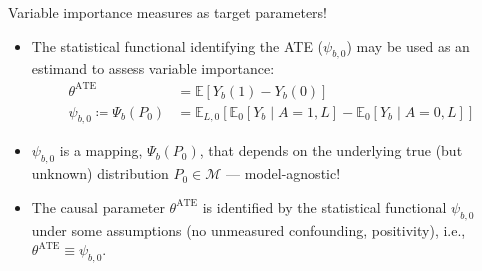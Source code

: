\documentclass{beamer}
\begin{document}
\begin{frame}[c]{Variable importance measures as target parameters!}

\begin{center}
\begin{itemize}
  \itemsep6pt
  \item The statistical functional identifying the ATE ($\psi_{b,0}$) may be
    used as an estimand to assess variable importance:
    \begin{align*}
      \theta^{\text{ATE}} &= \mathbb{E}[Y_b(1) - Y_b(0)] \\
      \psi_{b,0} \coloneqq \Psi_b(P_0) &= \mathbb{E}_{L,0}[\mathbb{E}_0[Y_b
        \mid A = 1, L] - \mathbb{E}_0[Y_b \mid A = 0, L]]
    \end{align*}
  \item $\psi_{b,0}$ is a mapping, $\Psi_b(P_0)$, that depends on the underlying
    true (but unknown) distribution $P_0 \in \mathcal{M}$ --- model-agnostic!
  \item The causal parameter $\theta^{\text{ATE}}$ is identified by the
    statistical functional $\psi_{b,0}$ under some assumptions (no unmeasured
    confounding, positivity), i.e., $\theta^{\text{ATE}} \equiv \psi_{b,0}$.
\end{itemize}
\end{center}

\end{frame}

\end{document}
